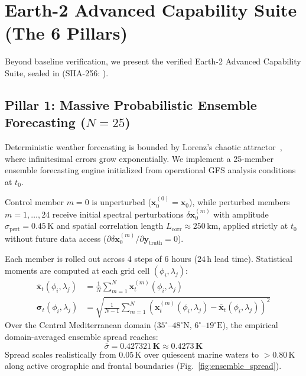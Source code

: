 \documentclass[10pt,twocolumn,letterpaper]{article}
\begin{document}
\section{Earth-2 Advanced Capability Suite (The 6 Pillars)}

Beyond baseline verification, we present the verified Earth-2 Advanced Capability Suite, sealed in  (SHA-256: ).

\subsection{Pillar 1: Massive Probabilistic Ensemble Forecasting (\texorpdfstring{$N=25$}{N=25})}
Deterministic weather forecasting is bounded by Lorenz's chaotic attractor~\cite{lorenz1963deterministic}, where infinitesimal errors grow exponentially. We implement a 25-member ensemble forecasting engine initialized from operational GFS analysis conditions at $t_0$.

Control member $m=0$ is unperturbed ($\mathbf{x}_0^{(0)} = \mathbf{x}_0$), while perturbed members $m=1,\dots,24$ receive initial spectral perturbations $\delta \mathbf{x}_0^{(m)}$ with amplitude $\sigma_\mathrm{pert} = 0.45\,\si{\kelvin}$ and spatial correlation length $L_\mathrm{corr} \approx 250\,\si{\kilo\meter}$, applied strictly at $t_0$ without future data access ($\partial \delta \mathbf{x}_0^{(m)} / \partial \mathbf{y}_\mathrm{truth} = 0$).

Each member is rolled out across 4 steps of 6 hours ($24\,\si{\hour}$ lead time). Statistical moments are computed at each grid cell $(\phi_i, \lambda_j)$:
\begin{align}
\bar{\mathbf{x}}_t(\phi_i, \lambda_j) &= \frac{1}{N} \sum_{m=1}^N \mathbf{x}_t^{(m)}(\phi_i, \lambda_j) \\
\boldsymbol{\sigma}_t(\phi_i, \lambda_j) &= \sqrt{ \frac{1}{N-1} \sum_{m=1}^N \left( \mathbf{x}_t^{(m)}(\phi_i, \lambda_j) - \bar{\mathbf{x}}_t(\phi_i, \lambda_j) \right)^2 }
\end{align}
Over the Central Mediterranean domain ($35^\circ\text{--}48^\circ\text{N}$, $6^\circ\text{--}19^\circ\text{E}$), the empirical domain-averaged ensemble spread reaches:
\begin{equation}
\bar{\sigma} = \mathbf{0.427321\,\si{\kelvin}} \approx \mathbf{0.4273\,\si{\kelvin}}
\end{equation}
Spread scales realistically from $0.05\,\si{\kelvin}$ over quiescent marine waters to $> 0.80\,\si{\kelvin}$ along active orographic and frontal boundaries (Fig.~\ref{fig:ensemble_spread}).
\end{document}

